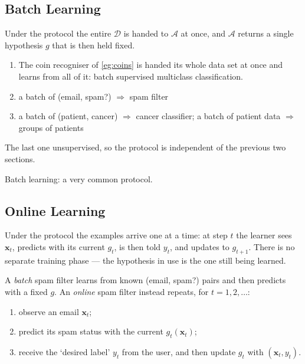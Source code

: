 \subsection{Batch Learning}

\begin{definition}\label{def:batch}
    Under the  protocol the entire \(\mathcal{D}\) is handed to
    \(\mathcal{A}\) at once, and \(\mathcal{A}\) returns a single hypothesis
    \(g\) that is then held fixed.
\end{definition}

\begin{eg}
    \begin{enumerate}
        \item The coin recogniser of \autoref{eg:coins} is handed its whole data set at once and learns from all of it: batch supervised multiclass classification.
        \item a batch of (email, spam?) \(\Rightarrow\) spam filter
        \item a batch of (patient, cancer) \(\Rightarrow\) cancer classifier; a batch of patient data \(\Rightarrow\) groups of patients
    \end{enumerate}
\end{eg}
\begin{remark}
    The last one unsupervised, so the protocol is independent of the previous two sections.
\end{remark}

\begin{moral}
    Batch learning: a very common protocol.
\end{moral}

\subsection{Online Learning}

\begin{definition}\label{def:online}
    Under the  protocol the examples arrive one at a time: at step
    \(t\) the learner sees \(\bm{x}_t\), predicts with its current \(g_t\), is
    then told \(y_t\), and updates to \(g_{t+1}\). There is no separate training
    phase --- the hypothesis in use is the one still being learned.
\end{definition}

\begin{eg}
    A \emph{batch} spam filter learns from known (email, spam?) pairs and then
    predicts with a fixed \(g\). An \emph{online} spam filter instead repeats,
    for \(t = 1, 2, \dots\):
    \begin{enumerate}
        \item observe an email \(\bm{x}_t\);
        \item predict its spam status with the current \(g_t(\bm{x}_t)\);
        \item receive the `desired label' \(y_t\) from the user, and then update
            \(g_t\) with \((\bm{x}_t, y_t)\).
    \end{enumerate}
\end{eg}

